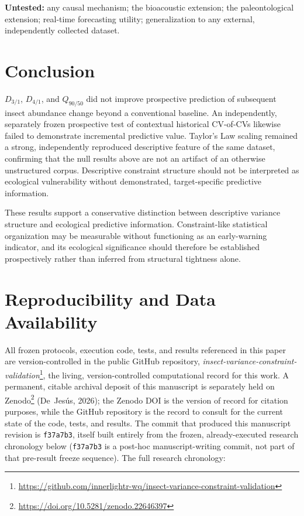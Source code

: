 \documentclass[11pt]{article}
\newcommand{\Dthreeone}{D_{3/1}}
\newcommand{\Dfourone}{D_{4/1}}
\newcommand{\Qninefifty}{Q_{90/50}}
\begin{document}
\textbf{Untested:} any causal mechanism; the bioacoustic extension; the
paleontological extension; real-time forecasting utility; generalization
to any external, independently collected dataset.

\section{Conclusion}

$\Dthreeone$, $\Dfourone$, and $\Qninefifty$ did not improve prospective
prediction of subsequent insect abundance change beyond a conventional
baseline. An independently, separately frozen prospective test of
contextual historical CV-of-CVs likewise failed to demonstrate incremental
predictive value. Taylor's Law scaling remained a strong, independently
reproduced descriptive feature of the same dataset, confirming that the
null results above are not an artifact of an otherwise unstructured
corpus. Descriptive constraint structure should not be interpreted as
ecological vulnerability without demonstrated, target-specific predictive
information.

These results support a conservative distinction between descriptive
variance structure and ecological predictive information.
Constraint-like statistical organization may be measurable without
functioning as an early-warning indicator, and its ecological
significance should therefore be established prospectively rather than
inferred from structural tightness alone.

\section{Reproducibility and Data Availability}

All frozen protocols, execution code, tests, and results referenced in
this paper are version-controlled in the public GitHub repository,
\emph{insect-variance-constraint-validation}\footnote{\url{https://github.com/innerlightr-wq/insect-variance-constraint-validation}},
the living, version-controlled computational record for this work. A
permanent, citable archival deposit of this manuscript is separately
held on Zenodo\footnote{\url{https://doi.org/10.5281/zenodo.22646397}}
(De~Jes\'us, 2026); the Zenodo DOI is the version of record for citation
purposes, while the GitHub repository is the record to consult for the
current state of the code, tests, and results. The commit that produced
this manuscript revision is \texttt{f37a7b3}, itself built entirely from
the frozen, already-executed research chronology below (\texttt{f37a7b3}
is a post-hoc manuscript-writing commit, not part of that pre-result
freeze sequence). The full research chronology:
\end{document}
